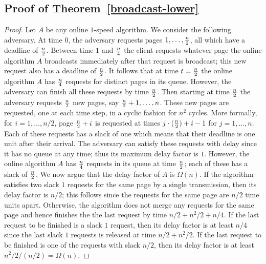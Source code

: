 \documentclass[11pt]{article}
\begin{document}
\subsection{Proof of Theorem~\ref{broadcast-lower}}
\begin{proof}
  Let $A$ be any online $1$-speed algorithm. We consider the following
  adversary. At time $0$, the adversary requests pages $1, \ldots, {n
    \over 2}$, all which have a deadline of $n \over 2$. Between time
  $1$ and $n \over 4$ the client requests whatever page the online
  algorithm $A$ broadcasts immediately after that request is
  broadcast; this new request also has a deadline of $n \over 2$. It
  follows that at time $t = {n \over 2}$ the online algorithm $A$ has
  $n \over 4$ requests for distinct pages in its queue. However, the
  adversary can finish all these requests by time $n \over 2$. Then
  starting at time ${n \over 2}$ the adversary requests $n \over 2$
  new pages, say ${n \over 2} +1, \ldots, n$.  These new pages are
  requested, one at each time step, in a cyclic fashion for $n^2$
  cycles.  More formally, for $i = 1, \ldots, n/2$, page ${n \over 2}
  + i$ is requested at times $j\cdot({n \over 2}) +i - 1$ for $j = 1,
  \ldots, n$. Each of these requests has a slack of one which means
  that their deadline is one unit after their arrival.  The adversary
  can satisfy these requests with delay since it has no queue at any
  time; thus its maximum delay factor is $1$.  However, the online
  algorithm $A$ has $n \over 4$ requests in its queue at time $n \over
  2$; each of these has a slack of $n \over 2$. We now argue that the
  delay factor of $A$ is $\Omega(n)$. If the algorithm satisfies two
  slack $1$ requests for the same page by a single transmission, then
  its delay factor is $n/2$; this follows since the requests for the
  same page are $n/2$ time units apart. Otherwise, the algorithm does
  not merge any requests for the same page and hence finishes the
  the last request by time $n/2 + n^2/2 + n/4$. If the
  last request to be finished is a slack $1$ request, then its delay
  factor is at least $n/4$ since the last slack $1$ requests is released
  at time $n/2 + n^2/2$. If the last request to be finished is
  one of the requests with slack $n/2$, then its delay factor
  is at least $n^2/2/(n/2) = \Omega(n)$.
\end{proof}
\end{document}
